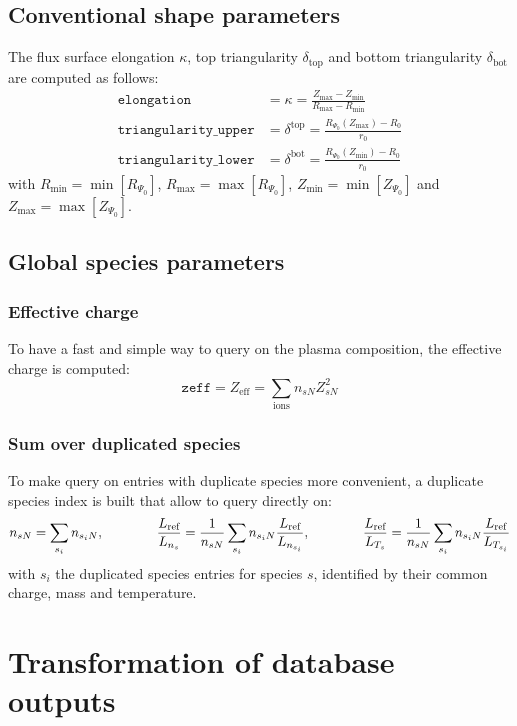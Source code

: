\documentclass[a4paper]{report}
\begin{document}
\section{Conventional shape parameters} \label{sec:shape}
The flux surface elongation $\kappa$, top triangularity $\delta_\textrm{top}$ and bottom triangularity $\delta_\textrm{bot}$ are computed as follows:
\begin{align*}
\texttt{elongation} &= \kappa = \frac{Z_\textrm{max}-Z_\textrm{min}}{R_\textrm{max}-R_\textrm{min}}\\ 
\texttt{triangularity\_upper} &=\delta^\textrm{top} = \frac{R_{\Psi_0}(Z_\textrm{max})-R_0}{r_0}\\
\texttt{triangularity\_lower} &=\delta^\textrm{bot} = \frac{R_{\Psi_0}(Z_\textrm{min})-R_0}{r_0}
\end{align*}
with $R_\textrm{min}=\min[R_{\Psi_0}]$, $R_\textrm{max}=\max[R_{\Psi_0}]$, $Z_\textrm{min}=\min[Z_{\Psi_0}]$ and $Z_\textrm{max}=\max[Z_{\Psi_0}]$.

\section{Global species parameters}
\subsection{Effective charge} \label{sec:zeff}
To have a fast and simple way to query on the plasma composition, the effective charge is computed:
$$\texttt{zeff}=Z_\textrm{eff} = \sum_\textrm{ions} n_{sN}Z_{sN}^2$$ 

\subsection{Sum over duplicated species}
To make query on entries with duplicate species more convenient, a duplicate species index is built that allow to query directly on:
$$n_{sN}=\sum_{s_i}n_{s_iN}, \qquad \qquad \frac{L_{\textrm{ref}}}{L_{n_s}}=\frac{1}{n_{sN}}\sum_{s_i}n_{s_iN}\frac{L_{\textrm{ref}}}{L_{n_{s_i}}}, \qquad \qquad \frac{L_{\textrm{ref}}}{L_{T_s}}=\frac{1}{n_{sN}}\sum_{s_i}n_{s_iN}\frac{L_{\textrm{ref}}}{L_{T_{s_i}}}$$
with $s_i$ the duplicated species entries for species $s$, identified by their common charge, mass and temperature.

\chapter{Transformation of database outputs}
\end{document}
